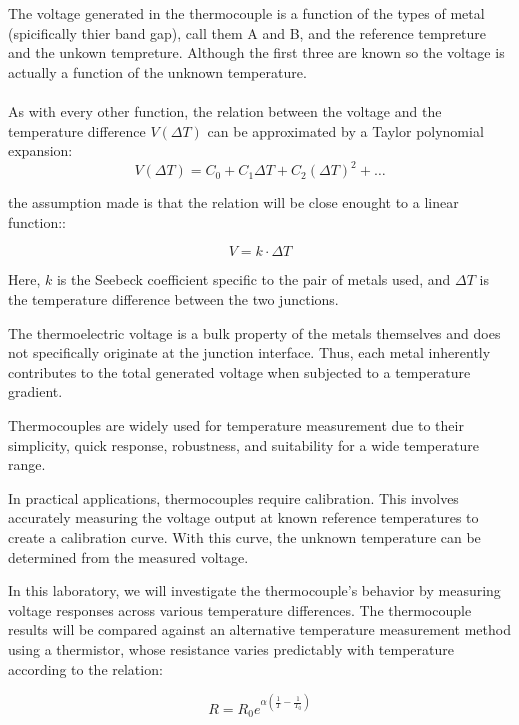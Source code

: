 \documentclass[12pt,a4paper]{article}
\begin{document}
The voltage generated in the thermocouple is a function of the types of metal (spicifically thier band gap), call them A and B, and  the reference tempreture and the unkown tempreture. Although the first three are known so the voltage is actually a function of the unknown temperature.

\paragraph{}
As with every other function, the relation between the voltage and the temperature difference $V(\Delta T)$ can be approximated by a Taylor polynomial expansion:
\begin{equation}
    V(\Delta T) = C_0 + C_1 \Delta T + C_2 (\Delta T)^2 + \ldots
\end{equation}

the assumption made is that the relation will be close enought to a linear function::

\begin{equation}
    V = k \cdot \Delta T
\end{equation}

Here, $k$ is the Seebeck coefficient specific to the pair of metals used, and $\Delta T$ is the temperature difference between the two junctions.

The thermoelectric voltage is a bulk property of the metals themselves and does not specifically originate at the junction interface. Thus, each metal inherently contributes to the total generated voltage when subjected to a temperature gradient.

Thermocouples are widely used for temperature measurement due to their simplicity, quick response, robustness, and suitability for a wide temperature range.

In practical applications, thermocouples require calibration. This involves accurately measuring the voltage output at known reference temperatures to create a calibration curve. With this curve, the unknown temperature can be determined from the measured voltage.

In this laboratory, we will investigate the thermocouple's behavior by measuring voltage responses across various temperature differences. The thermocouple results will be compared against an alternative temperature measurement method using a thermistor, whose resistance varies predictably with temperature according to the relation:

\begin{equation}
    R = R_0 e^{\alpha \left(\frac{1}{T} - \frac{1}{T_0}\right)}
\end{equation}
\end{document}

